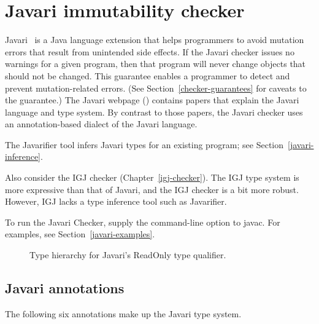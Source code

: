 \htmlhr
\chapter{Javari immutability checker\label{javari-checker}}

Javari~\cite{TschantzE2005,QuinonezTE2008} is a Java language extension that helps programmers to avoid mutation
errors that result from unintended side effects.
If the Javari checker issues no warnings for a given program, then that
program will never change objects that should not be changed.  This
guarantee enables a programmer to detect and prevent mutation-related
errors.  (See Section~\ref{checker-guarantees} for caveats to the guarantee.)
The Javari webpage () contains
papers that explain the Javari language and type system.
By contrast to those papers, the Javari checker uses an annotation-based
dialect of the Javari language.

The Javarifier tool infers Javari types for an existing program; see
Section~\ref{javari-inference}.

Also consider the IGJ checker (Chapter~\ref{igj-checker}).  The IGJ type
system is more expressive than that of Javari, and the IGJ checker is a bit
more robust.  However, IGJ lacks a type inference tool such as Javarifier.

To run the Javari Checker, supply the  command-line option to javac.  For
examples, see Section~\ref{javari-examples}.



\begin{figure}
\caption{Type hierarchy for Javari's ReadOnly type qualifier.}
\label{fig:javari-hierarchy}
\end{figure}


\section{Javari annotations\label{javary-annotations}}

The following six annotations make up the Javari type system.

